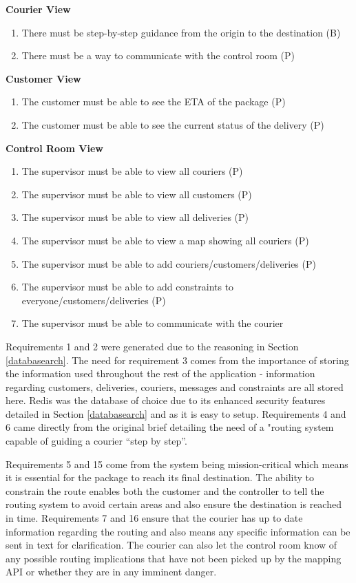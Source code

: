 \textbf{Courier View}
\begin{enumerate}[resume]
\item There must be step-by-step guidance from the origin to the destination (B)
\item There must be a way to communicate with the control room (P)
\end{enumerate}

\textbf{Customer View}
\begin{enumerate}[resume]
\item The customer must be able to see the ETA of the package (P)
\item The customer must be able to see the current status of the delivery (P)
\end{enumerate}

\textbf{Control Room View}
\begin{enumerate}[resume]

\item The supervisor must be able to view all couriers (P)
\item The supervisor must be able to view all customers (P)
\item The supervisor must be able to view all deliveries (P)
\item The supervisor must be able to view a map showing all couriers (P)
\item The supervisor must be able to add couriers/customers/deliveries (P)
\item The supervisor must be able to add constraints to everyone/customers/deliveries (P)
\item The supervisor must be able to communicate with the courier

\end{enumerate}

Requirements 1 and 2 were generated due to the reasoning in Section \ref{databasearch}. The need for requirement 3 comes from the importance of storing the information used throughout the rest of the application - information regarding customers, deliveries, couriers, messages and constraints are all stored here. Redis was the database of choice due to its enhanced security features detailed in Section \ref{databasearch} and as it is easy to setup. Requirements 4 and 6 came directly from the original brief detailing the need of a "routing system capable of guiding a courier “step by step”. 

Requirements 5 and 15 come from the system being mission-critical which means it is essential for the package to reach its final destination. The ability to constrain the route enables both the customer and the controller to tell the routing system to avoid certain areas and also ensure the destination is reached in time. Requirements 7 and 16 ensure that the courier has up to date information regarding the routing and also means any specific information can be sent in text for clarification. The courier can also let the control room know of any possible routing implications that have not been picked up by the mapping API or whether they are in any imminent danger. 

